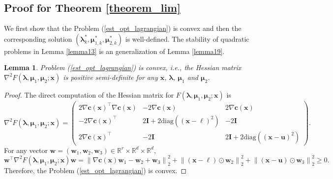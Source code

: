 \documentclass[aos]{imsart}
\numberwithin{equation}{section}
\theoremstyle{plain}
\newtheorem{lemma}{Lemma}
\begin{document}
\begin{appendix}
    \subsection{Proof for Theorem \ref{theorem_lim}}
We first show that the Problem (\ref{est_opt_lagrangian}) is convex and then the corresponding solution $(\bm{\lambda}_{k}^{*}, \bm{\mu}_{1,k}^{*}, \bm{\mu}_{2,k}^{*})$ is well-defined. The stability of quadratic problems in Lemma \ref{lemma13} is an generalization of Lemma \ref{lemma19}.
    \begin{lemma}
    Problem (\ref{est_opt_lagrangian}) is convex, i.e., the Hessian matrix $\nabla^2 F(\bm{\lambda}, \bm{\mu}_{1}, \bm{\mu}_2; \bm{x})$ is positive semi-definite for any $\bm{x}$, $\bm{\lambda}$, $\bm{\mu}_{1}$ and $\bm{\mu}_2$. 
\end{lemma}


\begin{proof}
    The direct computation of the Hessian matrix for $F(\bm{\lambda}, \bm{\mu}_{1}, \bm{\mu}_2; \bm{x})$ is
    \begin{equation}
        \nabla^2 F(\bm{\lambda}, \bm{\mu}_{1}, \bm{\mu}_2; \bm{x}) = \left( \begin{array}{ccc}
            2 \nabla \bm{c}(\bm{x})^{\top} \nabla \bm{c}(\bm{x})  & -2 \nabla \bm{c}(\bm{x}) & 2 \nabla \bm{c}(\bm{x}) \\
            -2 \nabla \bm{c}(\bm{x})^{\top} & 2 \bm{I} + 2 \text{diag}\left( \left( \bm{x} - \bm{\ell} \right)^2 \right) & -2 \bm{I} \\
            2 \nabla \bm{c}(\bm{x})^{\top} & -2 \bm{I} & 2 \bm{I} + 2 \text{diag}\left( \left( \bm{x} - \bm{u} \right)^2 \right) 
        \end{array} \right).
    \end{equation}
    For any vector $\bm{w} = (\bm{w}_1, \bm{w}_2, \bm{w}_3) \in \mathbb{R}^{r} \times \mathbb{R}^{d} \times \mathbb{R}^{d}$,
    \begin{equation*}
        \bm{w}^{\top} \nabla^2 F(\bm{\lambda}, \bm{\mu}_{1}, \bm{\mu}_2; \bm{x}) \bm{w} = \left\| \nabla \bm{c}(\bm{x}) \bm{w}_1 - \bm{w}_2 + \bm{w}_3 \right\|_2^2 + \left\| \left( \bm{x} - \bm{\ell} \right) \odot \bm{w}_2 \right\|_2^2 + \left\| \left( \bm{x} - \bm{u} \right) \odot \bm{w}_3 \right\|_2^2 \geq 0.
    \end{equation*}
    Therefore, the Problem (\ref{est_opt_lagrangian}) is convex.
\end{proof}



\end{appendix}
\end{document}
